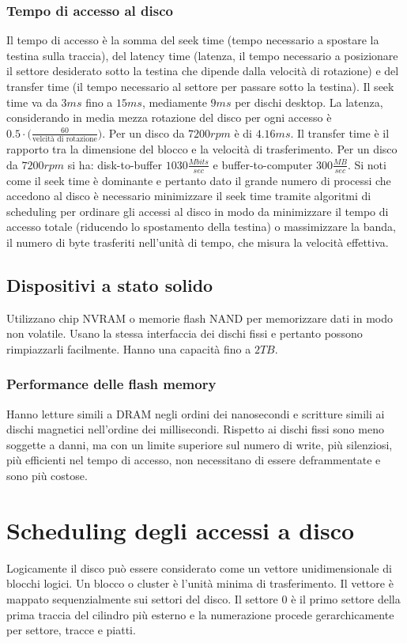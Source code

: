 \subsubsection{Tempo di accesso al disco}
Il tempo di accesso \`e la somma del seek time (tempo necessario a spostare la testina sulla traccia), del latency time (latenza, il tempo necessario a posizionare il settore desiderato 
sotto la testina che dipende dalla velocit\`a di rotazione) e del transfer time (il tempo necessario al settore per passare sotto la testina). Il seek time va da $3ms$ fino a $15ms$, 
mediamente $9ms$ per dischi desktop. La latenza, considerando in media mezza rotazione del disco per ogni accesso \`e $0.5\cdot\bigr(\frac{60}{\text{velcit\`a di rotazione}}\bigl)$. Per
un disco da $7200 rpm$ \`e di $4.16ms$. Il transfer time \`e il rapporto tra la dimensione del blocco e la velocit\`a di trasferimento. Per un disco da $7200rpm$ si ha: disk-to-buffer
$1030\frac{Mbits}{sec}$ e buffer-to-computer $300\frac{MB}{sec}$. Si noti come il seek time \`e dominante e pertanto dato il grande numero di processi che accedono al disco \`e 
necessario minimizzare il seek time tramite algoritmi di scheduling per ordinare gli accessi al disco in modo da minimizzare il tempo di accesso totale (riducendo lo spostamento della
testina) o massimizzare la banda, il numero di byte trasferiti nell'unit\`a di tempo, che misura la velocit\`a effettiva. 
\subsection{Dispositivi a stato solido}
Utilizzano chip NVRAM o memorie flash NAND per memorizzare dati in modo non volatile. Usano la stessa interfaccia dei dischi fissi e pertanto possono rimpiazzarli facilmente. Hanno una
capacit\`a fino a $2TB$. 
\subsubsection{Performance delle flash memory}
Hanno letture simili a DRAM negli ordini dei nanosecondi e scritture simili ai dischi magnetici nell'ordine dei millisecondi. Rispetto ai dischi fissi sono meno soggette a danni, ma
con un limite superiore sul numero di write, pi\`u silenziosi, pi\`u efficienti nel tempo di accesso, non necessitano di essere deframmentate e sono pi\`u costose. 
\section{Scheduling degli accessi a disco}
Logicamente il disco pu\`o essere considerato come un vettore unidimensionale di blocchi logici. Un blocco o cluster \`e l'unit\`a minima di trasferimento. Il vettore \`e mappato 
sequenzialmente sui settori del disco. Il settore $0$ \`e il primo settore della prima traccia del cilindro pi\`u esterno e la numerazione procede gerarchicamente per settore, tracce e
piatti. 
